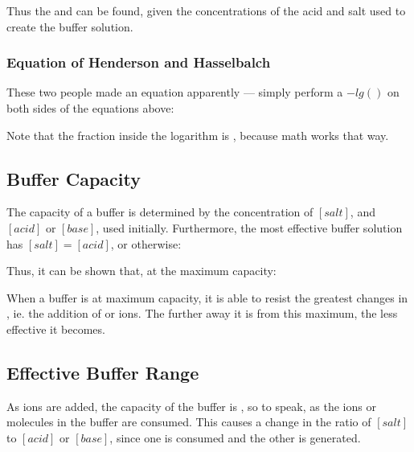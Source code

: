 			Thus the \pH{} and \pOH{} can be found, given the concentrations of the acid and salt used to create the buffer solution.


			\subsubsection{Equation of Henderson and Hasselbalch}

				These two people made an equation apparently --- simply perform a $-lg()$ on both sides of the equations above:


				Note that the fraction inside the logarithm is , because math works that way.




		\pagebreak
		\subsection{Buffer Capacity}

			The capacity of a buffer is determined by the concentration of $[salt]$, and $[acid]$ or $[base]$, used initially. Furthermore,
			the most effective buffer solution has $[salt] = [acid]$, or otherwise:


			Thus, it can be shown that, at the maximum capacity:


			When a buffer is at maximum capacity, it is able to resist the greatest changes in \pH{}, ie. the addition of  or 
			ions. The further away it is from this maximum, the less effective it becomes.



		\subsection{Effective Buffer Range}

			As  ions are added, the capacity of the buffer is , so to speak, as the ions or molecules in the buffer are
			consumed. This causes a change in the ratio of $[salt]$ to $[acid]$ or $[base]$, since one is consumed and the other is generated.

